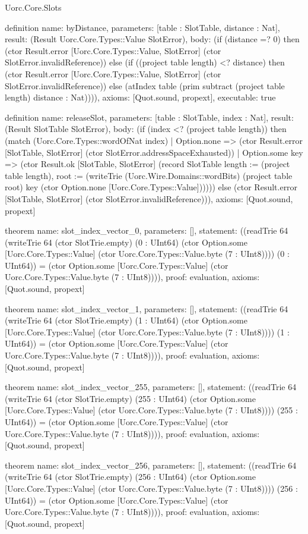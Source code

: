 \begin{lexlean}{Uorc.Core.Slots}
\begin{semanticmodule}
definition{
  name: byDistance,
  parameters: [table : SlotTable, distance : Nat],
  result: (Result Uorc.Core.Types::Value SlotError),
  body: (if (distance =? 0) then (ctor Result.error [Uorc.Core.Types::Value, SlotError] (ctor SlotError.invalidReference)) else (if ((project table length) <? distance) then (ctor Result.error [Uorc.Core.Types::Value, SlotError] (ctor SlotError.invalidReference)) else (atIndex table (prim subtract (project table length) distance : Nat)))),
  axioms: [Quot.sound, propext],
  executable: true
}

definition{
  name: releaseSlot,
  parameters: [table : SlotTable, index : Nat],
  result: (Result SlotTable SlotError),
  body: (if (index <? (project table length)) then (match (Uorc.Core.Types::wordOfNat index)
    | Option.none => (ctor Result.error [SlotTable, SlotError] (ctor SlotError.addressSpaceExhausted))
    | Option.some key => (ctor Result.ok [SlotTable, SlotError] (record SlotTable {length := (project table length), root := (writeTrie (Uorc.Wire.Domains::wordBits) (project table root) key (ctor Option.none [Uorc.Core.Types::Value]))}))) else (ctor Result.error [SlotTable, SlotError] (ctor SlotError.invalidReference))),
  axioms: [Quot.sound, propext]
}

theorem{
  name: slot_index_vector_0,
  parameters: [],
  statement: ((readTrie 64 (writeTrie 64 (ctor SlotTrie.empty) (0 : UInt64) (ctor Option.some [Uorc.Core.Types::Value] (ctor Uorc.Core.Types::Value.byte (7 : UInt8)))) (0 : UInt64)) = (ctor Option.some [Uorc.Core.Types::Value] (ctor Uorc.Core.Types::Value.byte (7 : UInt8)))),
  proof: evaluation{},
  axioms: [Quot.sound, propext]
}

theorem{
  name: slot_index_vector_1,
  parameters: [],
  statement: ((readTrie 64 (writeTrie 64 (ctor SlotTrie.empty) (1 : UInt64) (ctor Option.some [Uorc.Core.Types::Value] (ctor Uorc.Core.Types::Value.byte (7 : UInt8)))) (1 : UInt64)) = (ctor Option.some [Uorc.Core.Types::Value] (ctor Uorc.Core.Types::Value.byte (7 : UInt8)))),
  proof: evaluation{},
  axioms: [Quot.sound, propext]
}

theorem{
  name: slot_index_vector_255,
  parameters: [],
  statement: ((readTrie 64 (writeTrie 64 (ctor SlotTrie.empty) (255 : UInt64) (ctor Option.some [Uorc.Core.Types::Value] (ctor Uorc.Core.Types::Value.byte (7 : UInt8)))) (255 : UInt64)) = (ctor Option.some [Uorc.Core.Types::Value] (ctor Uorc.Core.Types::Value.byte (7 : UInt8)))),
  proof: evaluation{},
  axioms: [Quot.sound, propext]
}

theorem{
  name: slot_index_vector_256,
  parameters: [],
  statement: ((readTrie 64 (writeTrie 64 (ctor SlotTrie.empty) (256 : UInt64) (ctor Option.some [Uorc.Core.Types::Value] (ctor Uorc.Core.Types::Value.byte (7 : UInt8)))) (256 : UInt64)) = (ctor Option.some [Uorc.Core.Types::Value] (ctor Uorc.Core.Types::Value.byte (7 : UInt8)))),
  proof: evaluation{},
  axioms: [Quot.sound, propext]
}


\end{semanticmodule}
\end{lexlean}

